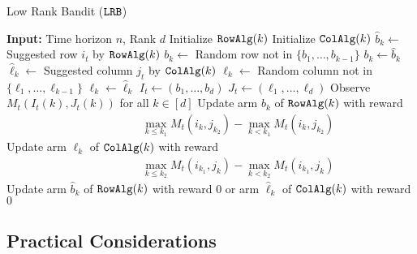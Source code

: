 \begin{algorithm}[t]
  \caption{Low Rank Bandit (${\tt LRB}$)}
  \label{alg:LRB}
  \begin{algorithmic}[1]
    \State \textbf{Input:} Time horizon $n$, Rank $d$
      \State Initialize ${\tt RowAlg} (k)$
      \State Initialize ${\tt ColAlg} (k)$
    \EndFor
        \State $\hat{b}_k \gets$ Suggested row $i_t$ by ${\tt RowAlg}(k)$
          \State $b_k \gets$ Random row not in $\{b_1, \dots, b_{k - 1}\}$
        \Else
          \State $b_k \gets \hat{b}_k$
        \EndIf
        \State $\hat{\ell}_k \gets$ Suggested column $j_t$ by ${\tt ColAlg}(k)$
          \State $\ell_k \gets$ Random column not in $\{\ell_1, \dots, \ell_{k - 1}\}$
        \Else
          \State $\ell_k \gets \hat{\ell}_k$
        \EndIf
      \EndFor
      \State $I_t \gets (b_1, \dots, b_d)$
      \State $J_t \gets (\ell_1, \dots, \ell_d)$
      \State Observe $M_t(I_t(k), J_t(k))$ for all $k \in [d]$
    \State Update arm $b_{k}$ of ${\tt RowAlg}(k)$ with reward
    \begin{align*}
    &\qquad \qquad \max_{k \leq k_1} M_t(i_k, j_{k_2}) - \max_{k < k_1} M_t(i_k, j_{k_2})
    \end{align*}
    \State Update arm $\ell_{k}$ of ${\tt ColAlg}(k)$ with reward
    \begin{align*}
    &\qquad \qquad \max_{k \leq k_2} M_t(i_{k_1}, j_k)  - \max_{k < k_2} M_t(i_{k_1}, j_k)
    \end{align*}
        \Else
          \State Update arm $\hat{b}_k$ of ${\tt RowAlg}(k)$ with reward $0$ or arm $\hat{\ell}_k$ of ${\tt ColAlg}(k)$ with reward $0$
        \EndIf
      \EndFor
      \EndFor
     \EndFor
  \end{algorithmic}
\end{algorithm}


\subsection{Practical Considerations}
\label{sec:practical considerations}



